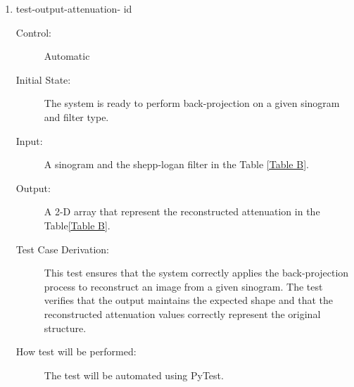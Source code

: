 \documentclass[12pt, titlepage]{article}
\newcounter{testnum}
\newcommand{\dthetestnum}{id\thetestnum}
\begin{document}
\begin{enumerate}
\item{test-output-attenuation- \label{id6} \dthetestnum}
\begin{description}
\item[Control:] Automatic

\item[Initial State:] The system is ready to perform back-projection on a given
  sinogram and filter type.

\item[Input:] A sinogram and the shepp-logan filter in the Table \ref{Table B}.

\item[Output:] A 2-D array that represent the reconstructed attenuation in the
  Table\ref{Table B}.

\item[Test Case Derivation:] This test ensures that the system correctly applies the back-projection process to reconstruct an image from a given sinogram. The test verifies that the output maintains the expected shape and that the reconstructed attenuation values correctly represent the original structure.

\item[How test will be performed:] The test will be automated using PyTest.
\end{description}
\end{enumerate}
\end{document}
